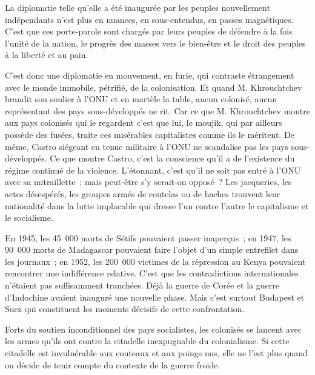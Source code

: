 \documentclass[french,twoside]{book} %
\begin{document}
La diplomatie telle qu’elle a été inaugurée par les peuples nouvellement indépendants n’est plus en nuances, en sous-entendus, en passes magnétiques. C’est que ces porte-parole sont chargés par leurs peuples de défendre à la fois l’unité de la nation, le progrès des masses vers le bien-être et le droit des peuples à la liberté et au pain.\par
C’est donc une diplomatie en mouvement, en furie, qui contraste étrangement avec le monde immobile, pétrifié, de la colonisation. Et quand M. Khrouchtchev brandit son soulier à l’ONU et en martèle la table, aucun colonisé, aucun représentant des pays sous-développés ne rit. Car ce que M. Khrouchtchev montre aux pays colonisés qui le regardent c’est que lui, le moujik, qui par ailleurs possède des fusées, traite ces misérables capitalistes comme ils le méritent. De même, Castro siégeant en tenue militaire à l’ONU ne scandalise pas les pays sous-développés. Ce que montre Castro, c’est la conscience qu’il a de l’existence du régime continué de la violence. L’étonnant, c’est qu’il ne soit pas entré à l’ONU avec sa mitraillette ; mais peut-être s’y serait-on opposé ? Les jacqueries, les actes désespérés, les groupes armés de coutelas ou de haches trouvent leur nationalité dans la lutte implacable qui dresse l’un contre l’autre le capitalisme et le socialisme.\par
\bigbreak
\noindent En 1945, les 45 000 morts de Sétifs pouvaient passer inaperçus ; en 1947, les 90 000 morts de Madagascar pouvaient faire l’objet d’un simple entrefilet dans les journaux ; en 1952, les 200 000 victimes de la répression au Kenya pouvaient rencontrer une indifférence relative. C’est que les contradictions internationales n’étaient pas suffisamment tranchées. Déjà la guerre de Corée et la guerre d’Indochine avaient inauguré une nouvelle phase. Mais c’est surtout Budapest et Suez qui constituent les moments décisifs de cette confrontation.\par
Forts du soutien inconditionnel des pays socialistes, les colonisés se lancent avec les armes qu’ils ont contre la citadelle   inexpugnable du colonialisme. Si cette citadelle est invulnérable aux couteaux et aux poings nus, elle ne l’est plus quand on décide de tenir compte du contexte de la guerre froide.\par
\end{document}
